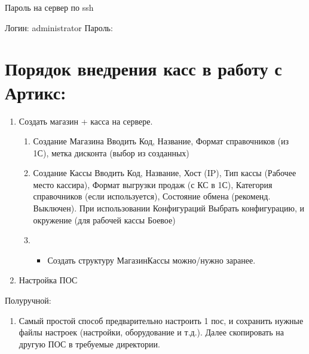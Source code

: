 \documentclass[twoside,11pt,a4paper,notitlepage]{report}
\begin{document}
\begin{figure}[htbp]
\centering

\noindent{}
\end{figure}

\sphinxAtStartPar
Пароль на сервер по ssh

\sphinxAtStartPar
Логин: administrator
Пароль: 


\section{Порядок внедрения касс в работу с Артикс:}
\label{\detokenize{setting:id5}}\begin{enumerate}
%
\item {} 
\sphinxAtStartPar
Создать магазин + касса на сервере.
\begin{enumerate}
%
\item {} 
\sphinxAtStartPar
Создание Магазина \sphinxhyphen{} Вводить Код, Название, Формат справочников (из 1С), метка дисконта (выбор из созданных)

\item {} 
\sphinxAtStartPar
Создание Кассы \sphinxhyphen{} Вводить Код, Название, Хост (IP), Тип кассы (Рабочее место кассира), Формат выгрузки продаж (с КС в 1С), Категория справочников (если используется), Состояние обмена (рекоменд. Выключен). При использовании Конфигураций \sphinxhyphen{} Выбрать конфигурацию, и окружение (для рабочей кассы \sphinxhyphen{} Боевое)

\item {} \begin{itemize}
\item {} 
\sphinxAtStartPar
Создать структуру Магазин\sphinxhyphen{}Кассы можно/нужно заранее.

\end{itemize}

\end{enumerate}

\item {} 
\sphinxAtStartPar
Настройка ПОС

\end{enumerate}

\sphinxAtStartPar
Полуручной:
\begin{enumerate}
%
\item {} 
\sphinxAtStartPar
Самый простой способ предварительно настроить 1 пос, и сохранить нужные файлы настроек (настройки, оборудование и т.д.). Далее скопировать на другую ПОС в требуемые директории.

\end{enumerate}
\end{document}
